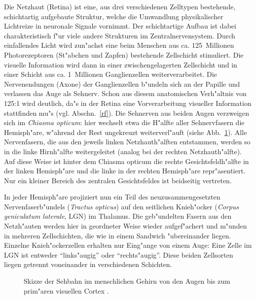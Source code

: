Die Netzhaut (Retina) ist eine, aus drei verschiedenen Zelltypen
bestehende, schichtartig aufgebaute Struktur, welche die Umwandlung
physikalischer Lichtreize in neuronale Signale vornimmt.  Der schichtartige
Aufbau ist dabei charakteristisch f"ur viele andere Strukturen im
Zentralnervensystem. Durch einfallendes Licht wird zun"achst eine beim
Menschen aus ca. 125~Millionen Photorezeptoren (St"abchen und Zapfen)
bestehende Zellschicht stimuliert.  Die visuelle Information wird dann in
einer zwischengelagerten Zellschicht und in einer Schicht aus
ca. 1~Millionen Ganglienzellen weiterverarbeitet. Die Nervenendungen
(Axone) der Ganglienzellen b"undeln sich an der Papille und verlassen das
Auge als Sehnerv. Schon aus diesem anatomischen Verh"altnis von 125:1 wird
deutlich, da"s in der Retina eine Vorverarbeitung visueller Information
stattfinden mu"s (vgl. Abschn.~\ref{rf}).  Die Sehnerven aus beiden Augen
verzweigen sich im \emph{Chiasma opticum}: hier wechselt etwa die H"alfte
aller Sehnervfasern die Hemisph"are, w"ahrend der Rest ungekreuzt
weiterverl"auft (siehe Abb.~\ref{sehbahn}).  Alle Nervenfasern, die aus den
jeweils linken Netzhauth"alften entstammen, werden so in die linke
Hirnh"alfte weitergeleitet (analog bei der rechten Netzhauth"alfte).  Auf
diese Weise ist hinter dem Chiasma opticum die rechte Gesichtsfeldh"alfte
in der linken Hemisph"are und die linke in der rechten Hemisph"are
repr"asentiert.  Nur ein kleiner Bereich des zentralen Gesichtsfeldes ist
beidseitig vertreten.

In jeder Hemisph"are projiziert nun ein Teil des neuzusammengesetzten
Nervenfaserb"undels (\emph{Tractus opticus}) auf den seitlichen Knieh"ocker
(\emph{Corpus geniculatum laterale}, LGN) im Thalamus.  Die geb"undelten
Fasern aus den Netzh"auten werden hier in geordneter Weise wieder
aufgef"achert und m"unden in mehreren Zellschichten, die wie in einem
Sandwich "ubereinander liegen.  Einzelne Knieh"ockerzellen erhalten nur
Eing"ange von einem Auge: Eine Zelle im LGN ist entweder ``links"augig''
oder ``rechts"augig''.  Diese beiden Zellsorten liegen getrennt voneinander
in verschiedenen Schichten.

\begin{figure}[t]
\begin{center}
\end{center}
\caption{Skizze der Sehbahn im menschlichen Gehirn von den Augen bis zum
prim"aren visuellen Cortex \protect{}.}
\label{sehbahn}
\end{figure}

